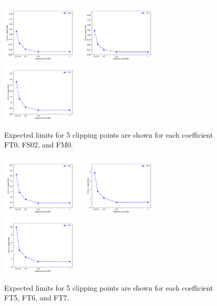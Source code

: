 \begin{figure}[ht]
    \centering
    	\includegraphics[width=0.35\textwidth]{figures/aQGC/ClippedFT0.pdf}
    	\includegraphics[width=0.35\textwidth]{figures/aQGC/ClippedFT1.pdf}
    	\includegraphics[width=0.35\textwidth]{figures/aQGC/ClippedFT2.pdf}
        \caption{Expected limits for 5 clipping points are shown for each coefficient FT0, FS02, and FM0.}
        \label{fig:ClippedLimits}
\end{figure}

\begin{figure}[ht]
    \centering
    	\includegraphics[width=0.35\textwidth]{figures/aQGC/ClippedFT5.pdf}
    	\includegraphics[width=0.35\textwidth]{figures/aQGC/ClippedFT6.pdf}
    	\includegraphics[width=0.35\textwidth]{figures/aQGC/ClippedFT7.pdf}
        \caption{Expected limits for 5 clipping points are shown for each coefficient FT5, FT6, and FT7.}
\end{figure}

